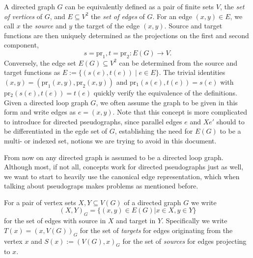 \begin{remark}  
  A directed graph $G$ can be equivalently defined
   as a pair
  of finite sets $V$, the \textit{set of vertices} of $G$, and $E
  \subseteq V^2$ the \textit{set of edges} of $G$.  For an edge $(x,y)
  \in E$, we call $x$ the \textit{source} and $y$ the target of the
  edge $(x,y)$. Source and target functions are then uniquely
  determined as the projections on the first and second component, 
  \[s = \mathrm{pr}_1, t = \mathrm{pr}_2: E(G) \to V.\] Conversely,
  the edge set $E(G) \subseteq V^2$ can be determined from the source
  and target functions as $E:=\{(s(e),t(e)) \mid e \in E\}$. The
  trivial identities $(x,y) = (\mathrm{pr}_1(x,y),\mathrm{pr}_2(x,y))$
  and $\mathrm{pr_1}(s(e), t(e)) = s(e)$ with $\mathrm{pr_2}(s(e),
  t(e)) = t(e)$ quickly verify the equivalence of the definitions.
  Given a directed loop graph $G$, we often assume the graph to be
  given in this form and write edges as $e=(x,y)$. Note that this
  concept is more complicated to introduce for directed pseudographs,
  since parallel edges $e$ and $Xe'$ should to be differentiated in the
  egde set of $G$, establishing the need for $E(G)$ to be a multi- or
  indexed set, notions we are trying to avoid in this document.
\end{remark}






From now on any directed graph is assumed to be a directed
loop graph. Although most, if not all, concepts work for directed
pseudographs just as well, we want to start to heavily use the
canonical edge representation, which when talking about pseudograps
makes problems as mentioned before.

For a pair of vertex sets $X,Y \subseteq V(G)$ of a directed graph $G$
we write 
\[ (X,Y)_G = \{(x,y) \in E(G) | x \in X, y \in Y \}\] for the set of
edges with source in $X$ and target in $Y$.  Specifically we write $T(x) = (x,V(G))_G$
for the set of \textit{targets} for edges originating from the vertex
$x$ and $S(x) := (V(G),x)_G$ for the set of \textit{sources} for edges
projecting to $x$.






